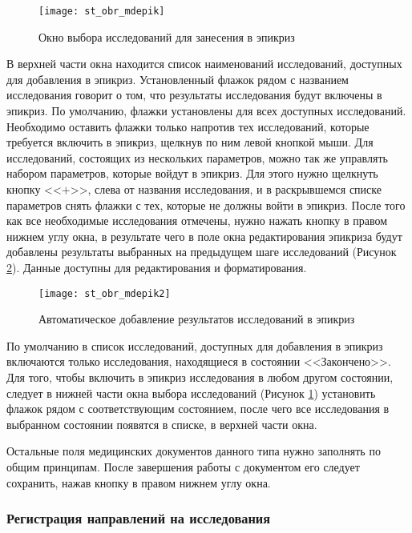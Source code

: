 \begin{figure}[ht]\centering
   \texttt{[image: st\_obr\_mdepik]}
   \caption{Окно выбора исследований для занесения в эпикриз}
   \label{img_st_obr_mdepik}
\end{figure} 

В верхней части окна находится список наименований исследований, доступных для добавления в эпикриз. Установленный флажок рядом с названием исследования говорит о том, что результаты исследования будут включены в эпикриз. По умолчанию, флажки установлены для всех доступных исследований. Необходимо оставить флажки только напротив тех исследований, которые требуется включить в эпикриз, щелкнув по ним левой кнопкой мыши. Для исследований, состоящих из нескольких параметров, можно так же управлять набором параметров, которые войдут в эпикриз. Для этого нужно щелкнуть кнопку <<$+$>>, слева от названия исследования, и в раскрывшемся списке параметров снять флажки с тех, которые не должны войти в эпикриз. После того как все необходимые исследования отмечены, нужно нажать кнопку   в правом нижнем углу окна, в результате чего в поле  окна редактирования эпикриза будут добавлены результаты выбранных на предыдущем шаге исследований (Рисунок \ref{img_st_obr_mdepik2}). Данные доступны для редактирования и форматирования.

\begin{figure}[ht]\centering
   \texttt{[image: st\_obr\_mdepik2]}
   \caption{Автоматическое добавление результатов исследований в эпикриз}
   \label{img_st_obr_mdepik2}
\end{figure} 

По умолчанию в список исследований, доступных для добавления в эпикриз включаются только исследования, находящиеся в состоянии <<Закончено>>. Для того, чтобы включить в эпикриз исследования в любом другом состоянии, следует в нижней части окна выбора исследований (Рисунок \ref{img_st_obr_mdepik}) установить флажок рядом с соответствующим состоянием, после чего все исследования в выбранном состоянии появятся в списке, в верхней части окна.

Остальные поля медицинских документов данного типа нужно заполнять по общим принципам. После завершения работы с документом его следует сохранить, нажав кнопку   в правом нижнем углу окна.

\subsubsection{Регистрация направлений на исследования}

